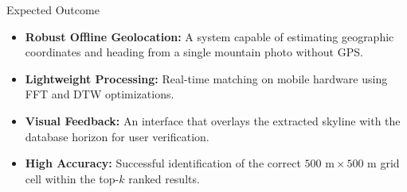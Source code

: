 
\begin{frame}{Expected Outcome}
    \begin{itemize}
        \item \textbf{Robust Offline Geolocation:} A system capable of estimating geographic coordinates and heading from a single mountain photo without GPS.
        \item \textbf{Lightweight Processing:} Real-time matching on mobile hardware using FFT and DTW optimizations.
        \item \textbf{Visual Feedback:} An interface that overlays the extracted skyline with the database horizon for user verification.
        \item \textbf{High Accuracy:} Successful identification of the correct $500 \text{ m} \times 500 \text{ m}$ grid cell within the top-$k$ ranked results.
    \end{itemize}
\end{frame}